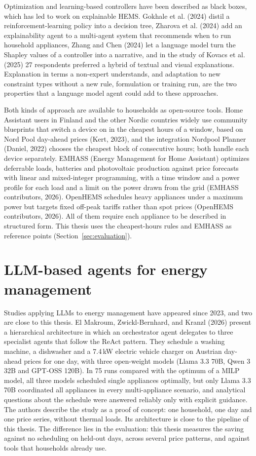 \documentclass[12pt,a4paper]{report}
\begin{document}
Optimization and learning-based controllers have been described as
black boxes, which has led to work on explainable HEMS. Gokhale et al.
(2024) distil a reinforcement-learning policy into a decision tree,
Zharova et al. (2024) add an explainability agent to a multi-agent
system that recommends when to run household appliances, Zhang and Chen
(2024) let a language model turn the Shapley values of a controller into
a narrative, and in the study of Kovacs et al. (2025) 27 respondents
preferred a hybrid of textual and visual explanations. Explanation in
terms a non-expert understands, and adaptation to new constraint types
without a new rule, formulation or training run, are the two properties
that a language model agent could add to these approaches.

Both kinds of approach are available to households as open-source
tools. Home Assistant users in Finland and the other Nordic countries
widely use community blueprints that switch a device on in the cheapest
hours of a window, based on Nord Pool day-ahead prices (Kert, 2023), and
the integration Nordpool Planner (Daniel, 2022) chooses the cheapest
block of consecutive hours; both handle each device separately. EMHASS
(Energy Management for Home Assistant) optimizes deferrable loads,
batteries and photovoltaic production against price forecasts with
linear and mixed-integer programming, with a time window and a power
profile for each load and a limit on the power drawn from the grid
(EMHASS contributors, 2026). OpenHEMS schedules heavy appliances under a
maximum power but targets fixed off-peak tariffs rather than spot prices
(OpenHEMS contributors, 2026). All of them require each appliance to be
described in structured form. This thesis uses the cheapest-hours rules
and EMHASS as reference points (Section~\ref{sec:evaluation}).

\section{LLM-based agents for energy management}

Studies applying LLMs to energy management have appeared since 2023,
and two are close to this thesis. El Makroum, Zwickl-Bernhard, and
Kranzl (2026) present a hierarchical architecture in which an
orchestrator agent delegates to three specialist agents that follow the
ReAct pattern. They schedule a washing machine, a dishwasher and a
7.4\,kW electric vehicle charger on Austrian day-ahead prices for one
day, with three open-weight models (Llama 3.3 70B, Qwen 3 32B and
GPT-OSS 120B). In 75 runs compared with the optimum of a MILP model, all
three models scheduled single appliances optimally, but only Llama 3.3
70B coordinated all appliances in every multi-appliance scenario, and
analytical questions about the schedule were answered reliably only with
explicit guidance. The authors describe the study as a proof of concept:
one household, one day and one price series, without thermal loads. Its
architecture is close to the pipeline of this thesis. The difference
lies in the evaluation: this thesis measures the saving against no
scheduling on held-out days, across several price patterns, and against
tools that households already use.
\end{document}
